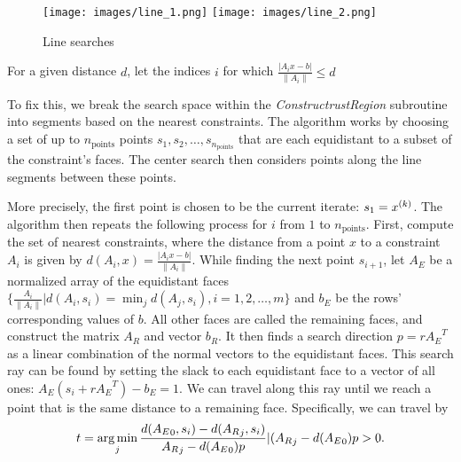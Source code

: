\begin{figure}[h]
    \centering
    \texttt{[image: images/line\_1.png]}
    \texttt{[image: images/line\_2.png]}
    \caption{Line searches}
    \label{first_line_search}
\end{figure}


For a given distance $d$, let the indices $i$ for which $\frac {|A_i x - b|}{\|A_i\|} \le d$


To fix this, we break the search space within the \emph{ConstructrustRegion} subroutine into segments based on the nearest constraints.
The algorithm works by choosing a set of up to $n_{\text{points}}$ points $s_1, s_2, \ldots, s_{n_{\text{points}}}$ that are each equidistant to a subset of the constraint's faces.
The center search then considers points along the line segments between these points.

More precisely, the first point is chosen to be the current iterate: $s_1 = {x^{(k)}}$.
The algorithm then repeats the following process for $i$ from $1$ to $n_{\text{points}}$.
First, compute the set of nearest constraints, where the distance from a point $x$ to a constraint $A_i$ is given by $d(A_i, x) = \frac {|A_i x - b|}{\|A_i\|}$.
While finding the next point $s_{i+1}$, let  $A_E$ be a normalized array of the equidistant faces $\{\frac{A_i}{\|A_i\|} | d(A_i, s_i) = \min_j d(A_j, s_i), i = 1, 2, \ldots, m\}$ and $b_E$ be the rows' corresponding values of $b$.
All other faces are called the remaining faces, and construct the matrix $A_R$ and vector $b_R$.
It then finds a search direction $p  = r{A_E}^T$ as a linear combination of the normal vectors to the equidistant faces.
This search ray can be found by setting the slack to each equidistant face to a vector of all ones: $A_E(s_i + r{A_E}^T) - b_E = 1$.
We can travel along this ray until we reach a point that is the same distance to a remaining face.
Specifically, we can travel by 
\begin{align}
t = \operatorname*{arg\,min}_j {\frac{d({A_E}_0, s_i) - d({A_R}_j, s_i)}{ {A_R}_j - d({A_E}_0) p} | ({A_R}_j - d({A_E}_0) p > 0 }. 
\end{align}

